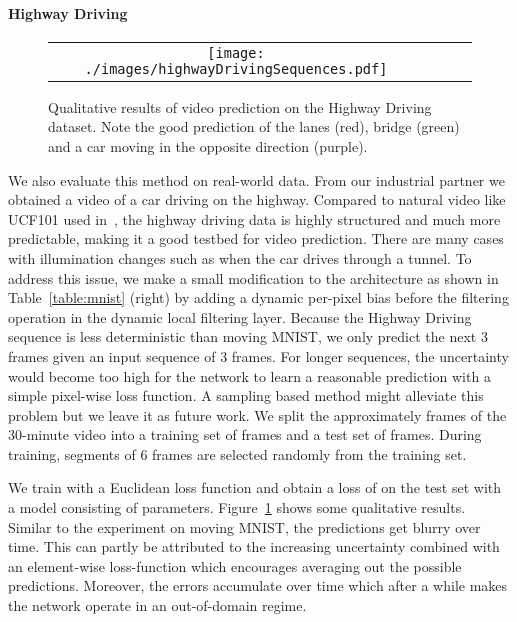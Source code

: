 \paragraph{Highway Driving}
\begin{figure}[t]
	\centering
	\begin{tabular}{cccc}
		\texttt{[image: ./images/highwayDrivingSequences.pdf]}
	\end{tabular}
	\caption{\small Qualitative results of video prediction on the Highway Driving dataset. Note the good prediction of the lanes (red), bridge (green) and a car moving in the opposite direction (purple).}
	\label{fig:highwayDrivingSequences}
\end{figure}
We also evaluate this method on real-world data. From our industrial partner we obtained a video of a car driving on the highway. Compared to natural video like UCF101 used in~\cite{Ranzato14,Mathieu-ICLR16}, the highway driving data is highly structured and much more predictable, making it a good testbed for video prediction. 
There are many cases with illumination changes such as when the car drives through a tunnel.
To address this issue, we make a small modification to the architecture as shown in Table~\ref{table:mnist} (right) by adding a dynamic per-pixel bias before the filtering operation in the dynamic local filtering layer.
Because the Highway Driving sequence is less deterministic than moving MNIST, we only predict the next 3 frames given an input sequence of 3 frames. 
For longer sequences, the uncertainty would become too high for the network to learn a reasonable prediction with a simple pixel-wise loss function. 
A sampling based method might alleviate this problem but we leave it as future work.
We split the approximately  frames of the 30-minute video into a training set of  frames and a test set of  frames. During training, segments of 6 frames are selected randomly from the training set. 

We train with a Euclidean loss function and obtain a loss of  on the test set with a model consisting of  parameters.
Figure~\ref{fig:highwayDrivingSequences} shows some qualitative results. 
Similar to the experiment on moving MNIST, the predictions get blurry over time. 
This can partly be attributed to the increasing uncertainty combined with an element-wise loss-function which encourages averaging out the possible predictions. 
Moreover, the errors accumulate over time which after a while makes the network operate in an out-of-domain regime.

